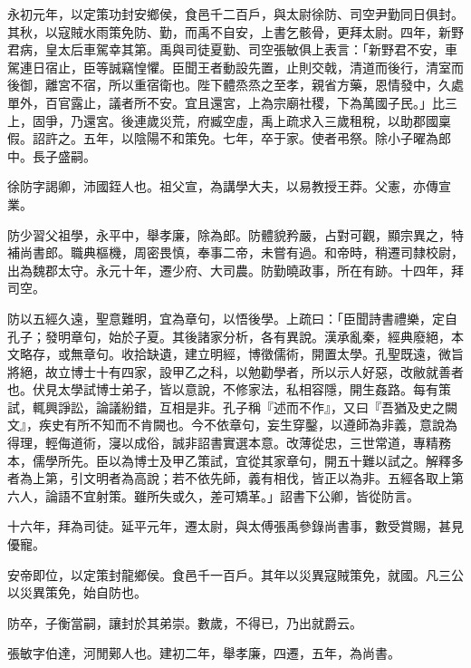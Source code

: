 \begin{pinyinscope}
永初元年，以定策功封安鄉侯，食邑千二百戶，與太尉徐防、司空尹勤同日俱封。其秋，以寇賊水雨策免防、勤，而禹不自安，上書乞骸骨，更拜太尉。四年，新野君病，皇太后車駕幸其第。禹與司徒夏勤、司空張敏俱上表言：「新野君不安，車駕連日宿止，臣等誠竊惶懼。臣聞王者動設先置，止則交戟，清道而後行，清室而後御，離宮不宿，所以重宿衛也。陛下體烝烝之至孝，親省方藥，恩情發中，久處單外，百官露止，議者所不安。宜且還宮，上為宗廟社稷，下為萬國子民。」比三上，固爭，乃還宮。後連歲災荒，府臧空虛，禹上疏求入三歲租稅，以助郡國稟假。詔許之。五年，以陰陽不和策免。七年，卒于家。使者弔祭。除小子曜為郎中。長子盛嗣。

徐防字謁卿，沛國銍人也。祖父宣，為講學大夫，以易教授王莽。父憲，亦傳宣業。

防少習父祖學，永平中，舉孝廉，除為郎。防體貌矜嚴，占對可觀，顯宗異之，特補尚書郎。職典樞機，周密畏慎，奉事二帝，未嘗有過。和帝時，稍遷司隸校尉，出為魏郡太守。永元十年，遷少府、大司農。防勤曉政事，所在有跡。十四年，拜司空。

防以五經久遠，聖意難明，宜為章句，以悟後學。上疏曰：「臣聞詩書禮樂，定自孔子；發明章句，始於子夏。其後諸家分析，各有異說。漢承亂秦，經典廢絕，本文略存，或無章句。收拾缺遺，建立明經，博徵儒術，開置太學。孔聖既遠，微旨將絕，故立博士十有四家，設甲乙之科，以勉勸學者，所以示人好惡，改敝就善者也。伏見太學試博士弟子，皆以意說，不修家法，私相容隱，開生姦路。每有策試，輒興諍訟，論議紛錯，互相是非。孔子稱『述而不作』，又曰『吾猶及史之闕文』，疾史有所不知而不肯闕也。今不依章句，妄生穿鑿，以遵師為非義，意說為得理，輕侮道術，寖以成俗，誠非詔書實選本意。改薄從忠，三世常道，專精務本，儒學所先。臣以為博士及甲乙策試，宜從其家章句，開五十難以試之。解釋多者為上第，引文明者為高說；若不依先師，義有相伐，皆正以為非。五經各取上第六人，論語不宜射策。雖所失或久，差可矯革。」詔書下公卿，皆從防言。

十六年，拜為司徒。延平元年，遷太尉，與太傅張禹參錄尚書事，數受賞賜，甚見優寵。

安帝即位，以定策封龍鄉侯。食邑千一百戶。其年以災異寇賊策免，就國。凡三公以災異策免，始自防也。

防卒，子衡當嗣，讓封於其弟崇。數歲，不得已，乃出就爵云。

張敏字伯達，河閒鄚人也。建初二年，舉孝廉，四遷，五年，為尚書。


\end{pinyinscope}
